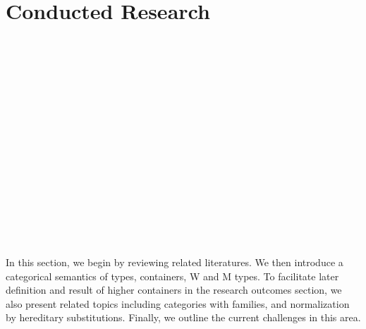 \chapter{Conducted Research}

\begin{code}[hide]%
\>[0]\AgdaSymbol{\{-\#}\AgdaSpace{}%
\AgdaSpace{}%
\AgdaSpace{}%
\AgdaSymbol{\#-\}}\<%
\\
%
\\[\AgdaEmptyExtraSkip]%
\>[0]\AgdaSpace{}%
\AgdaSpace{}%
\<%
\\
\>[0]\AgdaSpace{}%
\AgdaSpace{}%
\<%
\\
\>[0]\AgdaSpace{}%
\AgdaSpace{}%
\<%
\\
\>[0]\AgdaSpace{}%
\AgdaSpace{}%
\<%
\\
\>[0]\AgdaSpace{}%
\AgdaSpace{}%
\<%
\\
\>[0]\AgdaSpace{}%
\AgdaSpace{}%
\<%
\\
%
\\[\AgdaEmptyExtraSkip]%
\>[0]\AgdaSpace{}%
\AgdaSymbol{:}\AgdaSpace{}%
\<%
\\
\>[0]\AgdaSpace{}%
\AgdaSymbol{=}\AgdaSpace{}%
\<%
\\
%
\\[\AgdaEmptyExtraSkip]%
\>[0]\AgdaSpace{}%
\AgdaSymbol{:}\AgdaSpace{}%
\<%
\\
\>[0]\AgdaSpace{}%
\AgdaSymbol{=}\AgdaSpace{}%
\<%
\\
%
\\[\AgdaEmptyExtraSkip]%
\>[0]\AgdaSpace{}%
\AgdaSpace{}%
\AgdaSpace{}%
\AgdaSpace{}%
\AgdaSymbol{:}\AgdaSpace{}%
\<%
\end{code}

In this section, we begin by reviewing related literatures. We then introduce a categorical semantics of types, containers, W and M types. To facilitate later definition and result of higher containers in the research outcomes section, we also present related topics including categories with families, and normalization by hereditary substitutions. Finally, we outline the current challenges in this area.

